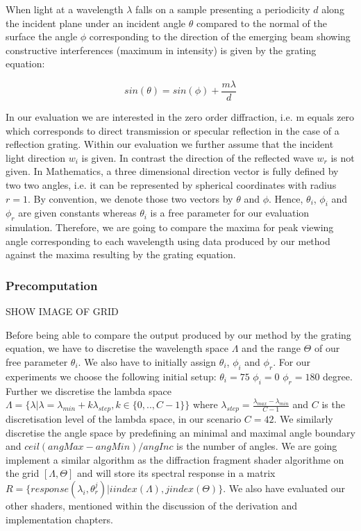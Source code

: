 When light at a wavelength $\lambda$ falls on a sample presenting a periodicity $d$ along the incident plane under an incident angle $\theta$ compared to the normal of the surface the angle $\phi$ corresponding to the direction of the emerging beam showing constructive interferences (maximum in intensity) is given by the grating equation:

\begin{equation}
  sin(\theta) = sin(\phi) + \frac{m \lambda}{d}
\end{equation}

In our evaluation we are interested in the zero order diffraction, i.e. m equals zero which corresponds to direct transmission or specular reflection in the case of a reflection grating. 
Within our evaluation we further assume that the incident light direction $w_i$ is given. In contrast the direction of the reflected wave $w_r$ is not given.
In Mathematics, a three dimensional direction vector is fully defined by two two angles, i.e. it can be represented by spherical coordinates with radius $r = 1$. By convention, we denote those two vectors by $\theta$ and $\phi$. Hence, $\theta_i$, $\phi_i$ and $\phi_r$ are given constants whereas $\theta_i$ is a free parameter for our evaluation simulation. Therefore, we are going to compare the maxima for peak viewing angle corresponding to each wavelength using data produced by our method against the maxima resulting by the grating equation.

\subsubsection{Precomputation}
SHOW IMAGE OF GRID

Before being able to compare the output produced by our method by the grating equation, we have to discretise the wavelength space $\Lambda$ and the range $\Theta$ of our free parameter $\theta_i$. We also have to initially assign  $\theta_i$, $\phi_i$ and $\phi_r$. For our experiments we choose the following initial setup: $\theta_i = 75$ $\phi_i = 0$ $\phi_r = 180$ degree.
Further we discretise the lambda space $\Lambda = \{\lambda | \lambda = \lambda_{min} + k\lambda_{step}, k \in \{0,..,C-1\}\}$ where $\lambda_{step} = \frac{\lambda_{max}-\lambda_{min}}{C-1}$ and $C$ is the discretisation level of the lambda space, in our scenario $C = 42$. We similarly discretise the angle space by predefining an minimal and maximal angle boundary and $ceil(angMax - angMin) / angInc$ is the number of angles. 
We are going implement a similar algorithm as the diffraction fragment shader algorithme on the grid $[\Lambda, \Theta]$ and will store its spectral response in a matrix $R = \{response(\lambda_i, \theta_{r}^{j}) | i index(\Lambda), j index(\Theta)\}$. We also have evaluated our other shaders, mentioned within the discussion of the derivation and implementation chapters.

